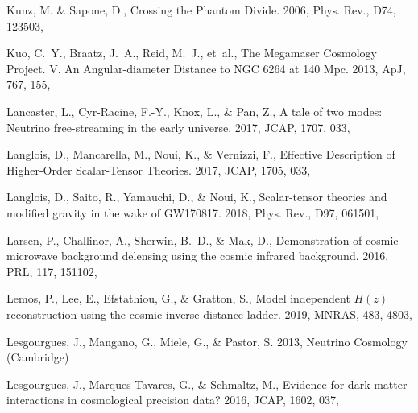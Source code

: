 \documentclass[longauth,traditabstract]{aa}
\def\apj{{ApJ}}
\def\mnras{{MNRAS}}
\def\prl{{PRL}}
\begin{document}
\begin{thebibliography}{379}
Kunz, M. \& Sapone, D., {Crossing the Phantom Divide}. 2006, Phys. Rev., D74,
  123503, 

{Kuo}, C.~Y., {Braatz}, J.~A., {Reid}, M.~J., {et~al.}, {The Megamaser
  Cosmology Project. V. An Angular-diameter Distance to NGC 6264 at 140 Mpc}.
  2013, \apj, 767, 155, 

Lancaster, L., Cyr-Racine, F.-Y., Knox, L., \& Pan, Z., {A tale of two modes:
  Neutrino free-streaming in the early universe}. 2017, JCAP, 1707, 033,

Langlois, D., Mancarella, M., Noui, K., \& Vernizzi, F., {Effective Description
  of Higher-Order Scalar-Tensor Theories}. 2017, JCAP, 1705, 033,

Langlois, D., Saito, R., Yamauchi, D., \& Noui, K., {Scalar-tensor theories and
  modified gravity in the wake of GW170817}. 2018, Phys. Rev., D97, 061501,

Larsen, P., Challinor, A., Sherwin, B.~D., \& Mak, D., {Demonstration of cosmic
  microwave background delensing using the cosmic infrared background}. 2016,
  \prl, 117, 151102, 

Lemos, P., Lee, E., Efstathiou, G., \& Gratton, S., {Model independent $H(z)$
  reconstruction using the cosmic inverse distance ladder}. 2019, \mnras, 483,
  4803, 

Lesgourgues, J., Mangano, G., Miele, G., \& Pastor, S. 2013, Neutrino Cosmology
  (Cambridge)

Lesgourgues, J., Marques-Tavares, G., \& Schmaltz, M., {Evidence for dark
  matter interactions in cosmological precision data?} 2016, JCAP, 1602, 037,


\end{thebibliography}
\end{document}
